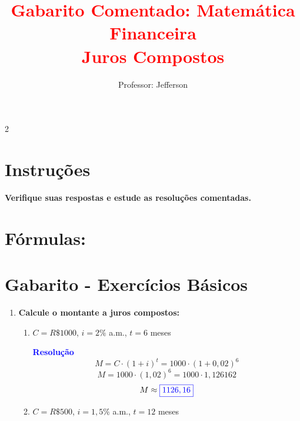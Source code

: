 \documentclass[11pt]{article}
\title{\textcolor{red}{Gabarito Comentado: Matemática Financeira \\
    Juros Compostos}}
\author{Professor: Jefferson}
\date{}
\newcommand{\resposta}[1]{\textcolor{blue}{\boxed{#1}}}
\begin{document}
\maketitle
\vspace{-1cm}

\begin{multicols}{2}

\section*{Instruções}
\textbf{Verifique suas respostas e estude as resoluções comentadas.}

\section*{Fórmulas: }

\vspace{0.5cm}


\vspace{0.5cm}

\section*{Gabarito - Exercícios Básicos}

\begin{enumerate}[leftmargin=*]

\item \textbf{Calcule o montante a juros compostos:}

\begin{enumerate}[label=\alph*)]
\item $C = R\$ 1000$, $i = 2\%$ a.m., $t = 6$ meses

\textbf{\textcolor{blue}{Resolução}}
\[
M = C \cdot (1 + i)^t = 1000 \cdot (1 + 0,02)^6
\]
\[
M = 1000 \cdot (1,02)^6 = 1000 \cdot 1,126162 
\]
        \[ M \approx \resposta{1126,16} \]

\item $C = R\$ 500$, $i = 1,5\%$ a.m., $t = 12$ meses


\end{enumerate}
\end{enumerate}
\end{multicols}
\end{document}
